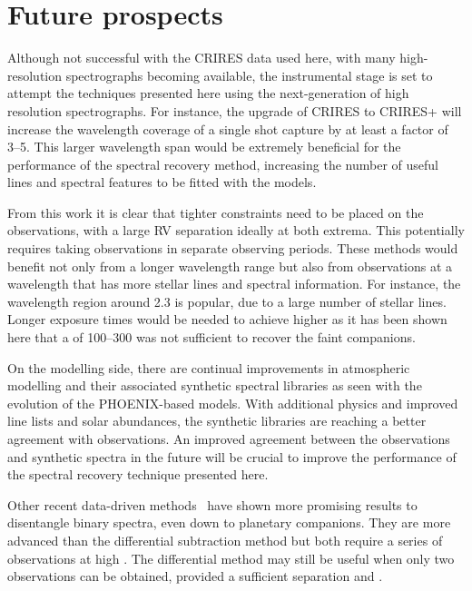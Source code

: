 \section{Future prospects}
\label{subsec:future}

Although not successful with the CRIRES data used here, with many high-resolution \nir{} spectrographs becoming available, the instrumental stage is set to attempt the techniques presented here using the next-generation of high resolution spectrographs.
For instance, the upgrade of CRIRES to CRIRES+ will increase the wavelength coverage of a single shot capture by at least a factor of 3--5.
This larger wavelength span would be extremely beneficial for the \textchisquared{} performance of the spectral recovery method, increasing the number of useful lines and spectral features to be fitted with the models.

From this work it is clear that tighter constraints need to be placed on the observations, with a large {RV} separation ideally at both extrema.
This potentially requires taking observations in separate observing periods.
These methods would benefit not only from a longer wavelength range but also from observations at a wavelength that has more stellar lines and spectral information.
For instance, the wavelength region around 2.3\um{} is popular, due to a large number of stellar  lines.
Longer exposure times would be needed to achieve higher \snr{} as it has been shown here that a \snr{} of 100--300 was not sufficient to recover the faint companions.

On the modelling side, there are continual improvements in atmospheric modelling and their associated synthetic spectral libraries as seen with the evolution of the PHOENIX-based models.
With additional physics and improved line lists and solar abundances, the synthetic libraries are reaching a better agreement with \nir{} observations.
An improved agreement between the \nir{} observations and synthetic spectra in the future will be crucial to improve the performance of the spectral recovery technique presented here.

Other recent data-driven methods~\citep[e.g.][]{piskorz_evidence_2016, czekala_disentangling_2017} have shown more promising results to disentangle binary spectra, even down to planetary companions.
They are more advanced than the differential subtraction method but both require a series of observations at high \snr{}.
The differential method may still be useful when only two observations can be obtained, provided a sufficient separation and \snr{}.

